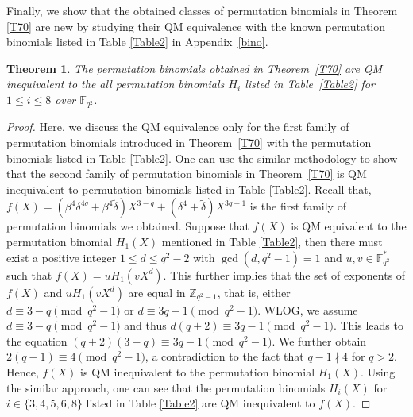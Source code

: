 \documentclass[12pt]{amsart}
\newtheorem{thm}{Theorem}[section]
\numberwithin{equation}{section}
\theoremstyle{definition}
\newcommand{\F}{\mathbb F}
\begin{document}
Finally, we show that the obtained classes of permutation binomials in Theorem \ref{T70} are new by studying their QM equivalence with the known permutation binomials listed in Table \ref{Table2} in Appendix~\ref{bino}.

 
\begin{thm}\label{binomialq1}
 The permutation binomials obtained in Theorem~\ref{T70} are QM inequivalent to the all permutation binomials $H_i$ listed in Table~\ref{Table2} for $1 \leq i \leq 8$ over $\F_{q^2}$.
\end{thm}
\begin{proof}
Here, we discuss the QM equivalence only for the first family of permutation binomials introduced in Theorem~\ref{T70} with the permutation binomials listed in Table \ref{Table2}. One can use the similar methodology to show that the second family of permutation binomials in Theorem~\ref{T70} is QM inequivalent to permutation binomials listed in Table \ref{Table2}. Recall that, $f(X)=(\beta^4 \delta^{4q} +\beta^4  {\tilde \delta}) X^{3-q}+(\delta^4+{\tilde \delta})X^{3q-1}$ is the first family of permutation binomials we obtained.  Suppose that $f(X)$ is QM equivalent to the permutation binomial $H_1(X)$ mentioned in Table \ref{Table2}, then there must exist a positive integer $1 \leq d \leq q^2-2$ with $\gcd(d,q^2-1)=1$ and $u, v \in \F_{q^2}^{*}$ such that $f(X)= uH_1(vX^d)$. This further implies that the set of exponents of $f(X)$ and $uH_1(vX^d)$ are equal in $\mathbb{Z}_{q^2-1}$, that is, either $d \equiv 3-q \pmod {q^2-1}$ or
$d \equiv 3q-1 \pmod {q^2-1}.$ WLOG, we assume $d \equiv 3-q \pmod {q^2-1}$ and thus $d(q+2) \equiv 3q-1 \pmod {q^2-1}$. This leads to the equation $(q+2)(3-q) \equiv 3q-1 \pmod {q^2-1}$. We further obtain $2(q-1) \equiv 4  \pmod {q^2-1}$, a contradiction to the fact that $q-1 \nmid 4$ for $q>2$. Hence, $f(X)$ is QM inequivalent to the permutation binomial $H_1(X)$. Using the similar approach, one can see that the permutation binomials
$H_i(X)$ for $i \in \{3,4,5,6,8\}$ listed in Table \ref{Table2} are QM inequivalent to $f(X)$. 


\end{proof}
\end{document}
